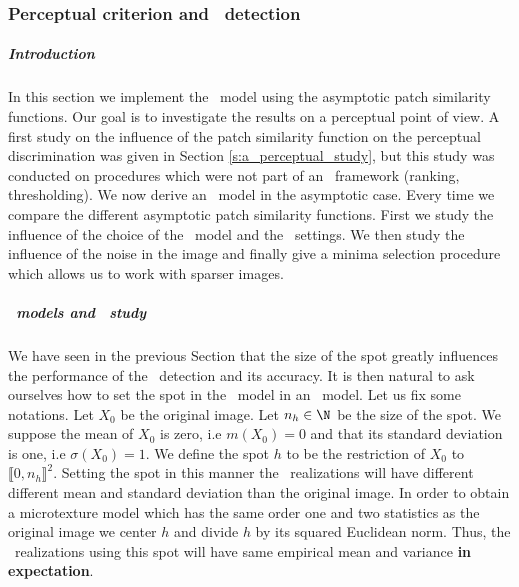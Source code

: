 \subsubsection{Perceptual criterion and \acontrario \ detection}
\subparagraph{Introduction}
In this section we implement the \acontrario \ model using the asymptotic patch similarity functions. Our goal is to investigate the results on a perceptual point of view. A first study on the influence of
the patch similarity function on the perceptual discrimination was given in Section \ref{s:a_perceptual_study}, but this study was conducted on procedures which were not part of an \acontrario \ framework (ranking, thresholding). We now derive an \acontrario \ model in the asymptotic case. Every time we compare the different asymptotic patch similarity functions. First we study the influence of the choice of the \ADSN \ model and the \NFA \ settings. We then study the influence of the noise in the image and finally give a minima selection procedure which allows us to work with sparser images.
\subparagraph{\ADSN \ models and \NFA \ study}
We have seen in the previous Section that the size of the spot greatly influences the performance of the \acontrario \ detection and its accuracy. It is then natural to ask ourselves how to set the spot in the \ADSN \ model in an \acontrario \ model. Let us fix some notations. Let $X_0$ be the original image. Let $n_h \in \N$ be the size of the spot. We suppose the mean of $X_0$ is zero, i.e $m(X_0) = 0$ and that its standard deviation is one, i.e $\sigma(X_0) = 1$. We define the spot $h$ to be the restriction of $X_0$ to $\llbracket 0,n_h \rrbracket^2$. Setting the spot in this manner the \ADSN \ realizations will have different different mean and standard deviation than the original image. In order to obtain a microtexture model which has the same order one and two statistics as the original image we center $h$ and divide $h$ by its squared Euclidean norm. Thus, the \ADSN \ realizations using this spot will have same empirical mean and variance \textbf{in expectation}.
